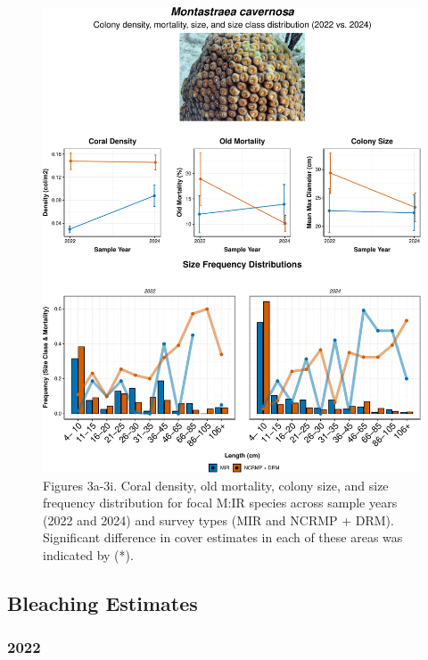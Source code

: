 \documentclass[
]{article}
\begin{document}
\begin{figure}

{\centering \includegraphics{MIR_quarto_files/figure-pdf/coral-tabyss-9.pdf}

}

\caption{Figures 3a-3i. Coral density, old mortality, colony size, and
size frequency distribution for focal M:IR species across sample years
(2022 and 2024) and survey types (MIR and NCRMP + DRM). Significant
difference in cover estimates in each of these areas was indicated by
(*).}

\end{figure}

\hypertarget{bleaching-estimates}{%
\subsection{Bleaching Estimates}\label{bleaching-estimates}}

\hypertarget{section}{%
\subsubsection{2022}\label{section}}
\end{document}
